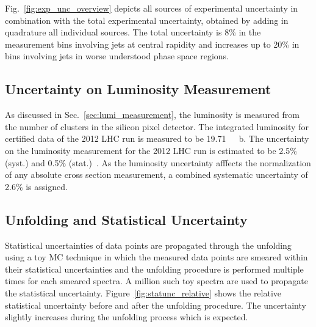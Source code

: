 Fig.~\ref{fig:exp_unc_overview} depicts all sources of experimental uncertainty
in combination with the total experimental uncertainty, obtained by adding in
quadrature all individual sources. The total uncertainty is 8\% in the
measurement bins involving jets at central rapidity and increases up to 20\% in
bins involving jets in worse understood phase space regions.


\subsection {Uncertainty on Luminosity Measurement}
\label{sec:luminosity_uncertainty}

As discussed in Sec.~\ref{sec:lumi_measurement}, the luminosity is measured from
the number of clusters in the silicon pixel detector. The integrated luminosity
for certified data of the 2012 LHC run is measured to be \SI{19.71}{\per \femto
\barn}. The uncertainty on the luminosity measurement for the 2012 LHC run is
estimated to be 2.5\% (syst.) and 0.5\% (stat.)~\cite{CMS-PAS-LUM-13-001}. As
the luminosity uncertainty afffects the normalization of any absolute cross
section measurement, a combined systematic uncertainty of 2.6\% is assigned.

\subsection{Unfolding and Statistical Uncertainty}
\label{sec:stat_unf_uncert}

Statistical uncertainties of data points are propagated through the unfolding
using a toy MC technique in which the measured data points are smeared within
their statistical uncertainties and the unfolding procedure is performed
multiple times for each smeared spectra. A million such toy spectra are used to
propagate the statistical uncertainty.  Figure~\ref{fig:statunc_relative} shows
the relative statistical uncertainty before and after the unfolding procedure.
The uncertainty slightly increases during the unfolding process which is
expected.

